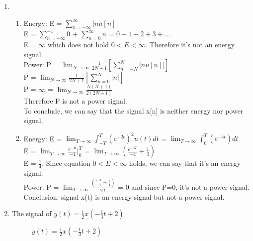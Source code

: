 \documentclass[10pt,a4paper, margin=1in]{article}
\begin{document}
\begin{enumerate}
\item %
    \begin{enumerate}
    \item Energy: E = $\sum_{n=-\infty}^{\infty} \vert nu[n]\vert$ \\
    E = $\sum_{n=-\infty}^{-1}0$ + $\sum_{n=0}^{\infty}n$ = $0 + 1 + 2 + 3 + ...$ \\
    E = $\infty$ which does not hold $0 < E < \infty$. Therefore it's not an energy signal. \\
    Power: P = $\lim_{N\to\infty} \frac{1}{2N+1} [\sum_{n=-N}^{N} \vert nu[n]\vert]$ \\
    P = $\lim_{N\to\infty} \frac{1}{2N+1} [\sum_{n=0}^{N} \vert n\vert]$ \\
    P = $\infty$ = $\lim_{N\to\infty} \frac{N(N+1)}{2(2N+1)} $ \\
    Therefore P is not a power signal. \\
    To conclude, we can say that the signal x[n] is neither energy nor power signal.
    \item Energy: E = $\lim_{T\to\infty}\int_{-T}^{T} (e^{-2t})^2u(t)dt$ = $\lim_{T\to\infty}\int_{0}^{T} (e^{-4t})dt$ \\
    E = $\lim_{T\to\infty}\frac{e^{-4t}}{-4}\rvert_{0}^{T}$ = $\lim_{T\to\infty}(\frac{e^{-4T}}{-4} + \frac{1}{4})$ \\
    E = $\frac{1}{4}$. Since equation $0 < E < \infty$ holds, we can say that it's an energy signal. \\
    Power: P = $\lim_{T\to\infty}\frac{(\frac{e^{-4t}}{-4} + \frac{1}{4})}{2T}$ = $0$ and since P=0, it's not a power signal. \\
    Conclusion: signal x(t) is an energy signal but not a power signal.
    \end{enumerate}

\item The signal of $y(t) = \frac{1}{2}x(-\frac{1}{3}t+2)$ \\
    \begin{figure}[h!]
    \centering
        \caption{$y(t) = \frac{1}{2}x(-\frac{1}{3}t+2)$}
        \label{fig:fig1}
    \end{figure}


\end{enumerate}
\end{document}

